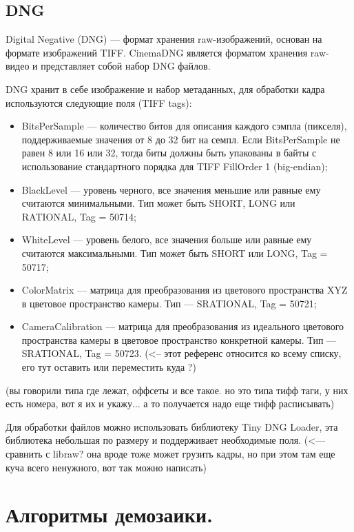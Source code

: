 \subsection{DNG}

Digital Negative (DNG) --- формат хранения raw-изображений, основан на формате изображений TIFF. CinemaDNG является форматом хранения raw-видео и представляет собой набор DNG файлов. 

DNG хранит в себе изображение и набор метаданных, для обработки кадра используются следующие поля (TIFF tags):
\begin{itemize}
	\item BitsPerSample --- количество битов для описания каждого сэмпла (пикселя), поддерживаемые значения от 8 до 32 бит на семпл. Если BitsPerSample не равен 8 или 16 или 32, тогда биты должны быть упакованы в байты с использование стандартного порядка для TIFF FillOrder 1 (big-endian);
	\item BlackLevel --- уровень черного, все значения меньшие или равные ему считаются минимальными. Тип может быть SHORT, LONG или RATIONAL, Tag = 50714;
	\item WhiteLevel --- уровень белого, все значения больше или равные ему считаются максимальными. Тип может быть SHORT или LONG, Tag = 50717;
	\item ColorMatrix --- матрица для преобразования из цветового пространства XYZ в цветовое пространство камеры. Тип --- SRATIONAL, Tag = 50721;
	\item CameraCalibration --- матрица для преобразования из идеального цветового пространства камеры в цветовое пространство конкретной камеры. Тип --- SRATIONAL, Tag = 50723. \cite{dngspec} (<-- этот референс относится ко всему списку, его тут оставить или переместить куда ?)
\end{itemize}

(вы говорили типа где лежат, оффсеты и все такое. но это типа тифф таги, у них есть номера, вот я их и укажу... а то получается надо еще тифф расписывать)

Для обработки файлов можно использовать библиотеку \guillemotleft Tiny DNG Loader\guillemotright, эта библиотека небольшая по размеру и поддерживает необходимые поля. (<--- сравнить с libraw? она вроде тоже может грузить кадры, но при этом там еще куча всего ненужного, вот так можно написать)
\section{Алгоритмы демозаики.}

